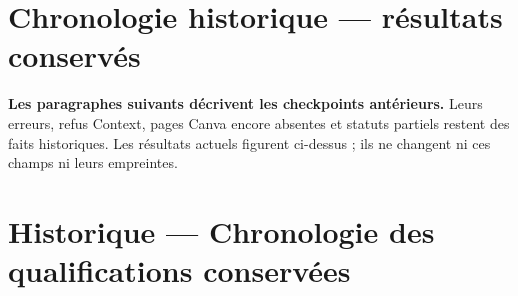 \documentclass[
  canadien,
  11pt,
  a4paper,
]{report}
\begin{document}
\section{Chronologie historique --- résultats
conservés}\label{chronologie-historique-ruxe9sultats-conservuxe9s}

\textbf{Les paragraphes suivants décrivent les checkpoints antérieurs.}
Leurs erreurs, refus Context, pages Canva encore absentes et statuts
partiels restent des faits historiques. Les résultats actuels figurent
ci-dessus ; ils ne changent ni ces champs ni leurs empreintes.

\section{Historique --- Chronologie des qualifications
conservées}\label{historique-chronologie-des-qualifications-conservuxe9es}
\end{document}
